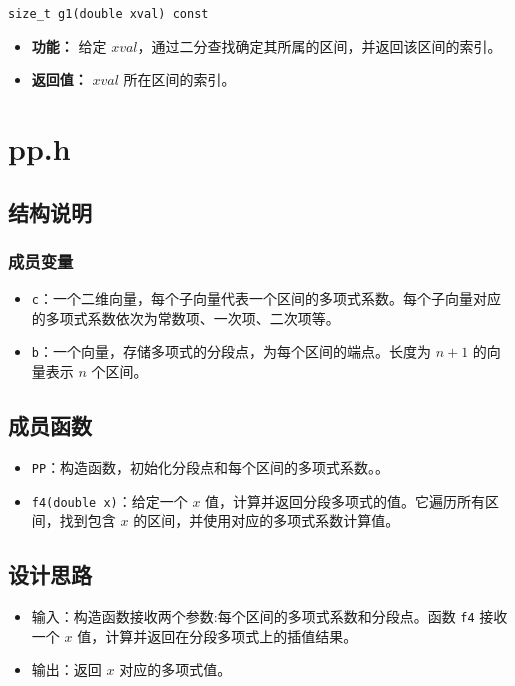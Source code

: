 \documentclass[a4paper]{article}
\begin{document}
\begin{verbatim}
size_t g1(double xval) const
\end{verbatim}

\begin{itemize}
    \item \textbf{功能：} 给定 \( xval \)，通过二分查找确定其所属的区间，并返回该区间的索引。
    \item \textbf{返回值：} \( xval \) 所在区间的索引。
\end{itemize}

\section{pp.h}
\subsection{结构说明}
\subsubsection{成员变量}

\begin{itemize}
    \item \texttt{c}：一个二维向量，每个子向量代表一个区间的多项式系数。每个子向量对应的多项式系数依次为常数项、一次项、二次项等。
    \item \texttt{b}：一个向量，存储多项式的分段点，为每个区间的端点。长度为 \(n+1\) 的向量表示 \(n\) 个区间。
\end{itemize}

\subsection{成员函数}

\begin{itemize}
    \item \texttt{PP}：构造函数，初始化分段点和每个区间的多项式系数。。
    \item \texttt{f4(double x)}：给定一个 \(x\) 值，计算并返回分段多项式的值。它遍历所有区间，找到包含 \(x\) 的区间，并使用对应的多项式系数计算值。
\end{itemize}

\subsection{设计思路}

\begin{itemize}
    \item 
    输入：构造函数接收两个参数:每个区间的多项式系数和分段点。函数 \texttt{f4} 接收一个 \(x\) 值，计算并返回在分段多项式上的插值结果。
    
    \item 输出：返回 \(x\) 对应的多项式值。

\end{itemize}
\end{document}
